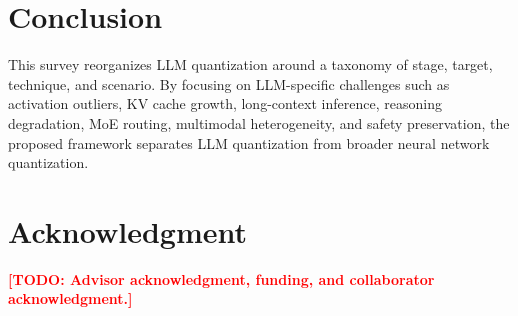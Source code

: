 \documentclass[journal,10pt]{IEEEtran}
\newcommand{\TODO}[1]{\textcolor{red}{\textbf{[TODO: #1]}}}
\begin{document}
\section{Conclusion}
This survey reorganizes LLM quantization around a taxonomy of stage, target, technique, and scenario. By focusing on LLM-specific challenges such as activation outliers, KV cache growth, long-context inference, reasoning degradation, MoE routing, multimodal heterogeneity, and safety preservation, the proposed framework separates LLM quantization from broader neural network quantization.

\section*{Acknowledgment}
\TODO{Advisor acknowledgment, funding, and collaborator acknowledgment.}

\balance
\end{document}
